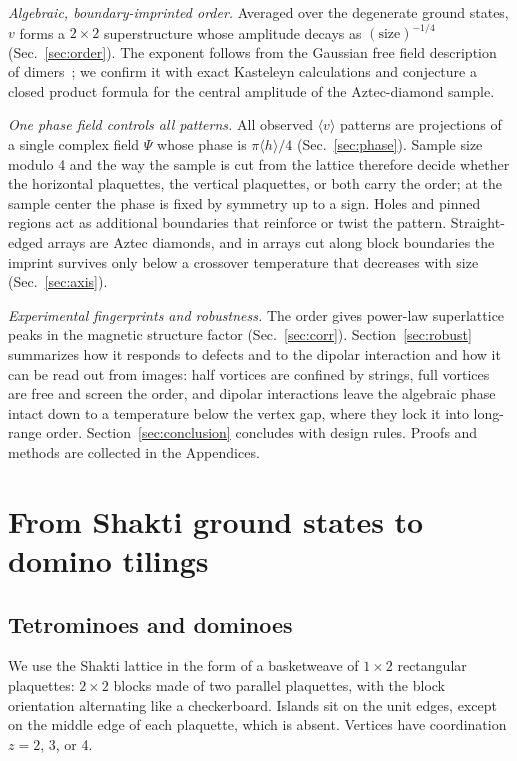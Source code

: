 \documentclass[aps,prb,twocolumn,floatfix,longbibliography]{revtex4-2}
\begin{document}
\emph{Algebraic, boundary-imprinted order.} Averaged over the degenerate ground states, $v$ forms a $2\times2$ superstructure whose amplitude decays as $(\text{size})^{-1/4}$ (Sec.~\ref{sec:order}). The exponent follows from the Gaussian free field description of dimers~\cite{Kenyon2001}; we confirm it with exact Kasteleyn calculations and conjecture a closed product formula for the central amplitude of the Aztec-diamond sample.

\emph{One phase field controls all patterns.} All observed $\langle v\rangle$ patterns are projections of a single complex field $\Psi$ whose phase is $\pi\langle h\rangle/4$ (Sec.~\ref{sec:phase}). Sample size modulo 4 and the way the sample is cut from the lattice therefore decide whether the horizontal plaquettes, the vertical plaquettes, or both carry the order; at the sample center the phase is fixed by symmetry up to a sign. Holes and pinned regions act as additional boundaries that reinforce or twist the pattern. Straight-edged arrays are Aztec diamonds, and in arrays cut along block boundaries the imprint survives only below a crossover temperature that decreases with size (Sec.~\ref{sec:axis}).

\emph{Experimental fingerprints and robustness.} The order gives power-law superlattice peaks in the magnetic structure factor (Sec.~\ref{sec:corr}). Section~\ref{sec:robust} summarizes how it responds to defects and to the dipolar interaction and how it can be read out from images: half vortices are confined by strings, full vortices are free and screen the order, and dipolar interactions leave the algebraic phase intact down to a temperature below the vertex gap, where they lock it into long-range order. Section~\ref{sec:conclusion} concludes with design rules. Proofs and methods are collected in the Appendices.

\section{From Shakti ground states to domino tilings}
\label{sec:mapping}

\subsection{Tetrominoes and dominoes}

We use the Shakti lattice in the form of a basketweave of $1\times2$ rectangular plaquettes: $2\times2$ blocks made of two parallel plaquettes, with the block orientation alternating like a checkerboard. Islands sit on the unit edges, except on the middle edge of each plaquette, which is absent. Vertices have coordination $z=2$, 3, or 4.
\end{document}
